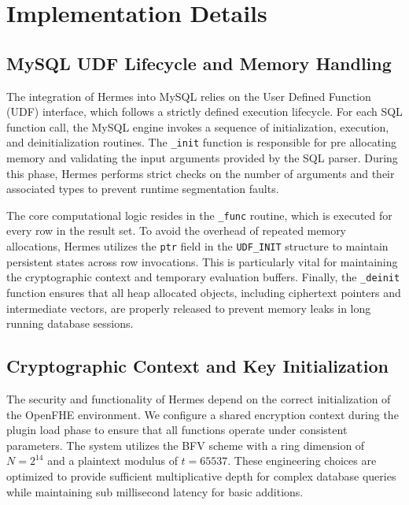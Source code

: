 \documentclass[sigconf,nonacm]{acmart}
\begin{document}
\section{Implementation Details}
\label{appendix:implementation}

\subsection{MySQL UDF Lifecycle and Memory Handling}

The integration of Hermes into MySQL relies on the User Defined Function (UDF) interface, which follows a strictly defined execution lifecycle. For each SQL function call, the MySQL engine invokes a sequence of initialization, execution, and deinitialization routines. The \texttt{\_init} function is responsible for pre allocating memory and validating the input arguments provided by the SQL parser. During this phase, Hermes performs strict checks on the number of arguments and their associated types to prevent runtime segmentation faults.

The core computational logic resides in the \texttt{\_func} routine, which is executed for every row in the result set. To avoid the overhead of repeated memory allocations, Hermes utilizes the \texttt{ptr} field in the \texttt{UDF\_INIT} structure to maintain persistent states across row invocations. This is particularly vital for maintaining the cryptographic context and temporary evaluation buffers. Finally, the \texttt{\_deinit} function ensures that all heap allocated objects, including ciphertext pointers and intermediate vectors, are properly released to prevent memory leaks in long running database sessions.

\subsection{Cryptographic Context and Key Initialization}

The security and functionality of Hermes depend on the correct initialization of the OpenFHE environment. We configure a shared encryption context during the plugin load phase to ensure that all functions operate under consistent parameters. The system utilizes the BFV scheme with a ring dimension of $N = 2^{14}$ and a plaintext modulus of $t = 65537$. These engineering choices are optimized to provide sufficient multiplicative depth for complex database queries while maintaining sub millisecond latency for basic additions.
\end{document}
